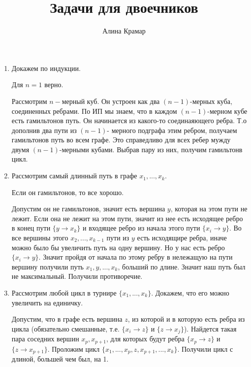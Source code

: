 \documentclass{article}
\begin{document}
\title{Задачи для двоечников}
\author{Алина Крамар}

\maketitle
\begin{enumerate}

\item

Докажем по индукции.

Для $n=1$ верно.

Рассмотрим $n-$мерный куб. Он
устроен как два $(n-1)$-мерных куба, соединенных ребрами. По ИП мы знаем, что в
каждом $(n-1)$-мерном кубе есть гамильтонов путь. Он начинается из
какого-то соединаяющего ребра. Т.о дополнив два пути из $(n-1)$-
мерного подграфа этим ребром, получаем гамильтонов путь во всем
графе. Это справедливо для всех ребер мужду двумя $(n-1)$-мерными
кубами. Выбрав пару из них, получим гамильтонв цикл.

\item

Рассмотрим самый длинный путь в графе $x_{1},...,x_{k}$.

Если он гамильтонов, то все
хорошо.

Допустим он не гамильтонов,
значит есть вершина $y$, которая на этом пути не лежит. Если она не лежит
на этом пути, значит из нее есть исходящее ребро в конец пути $\{y \to
x_{k}\}$ и входящее ребро из начала этого пути $\{x_{i} \to y\}$. Во
все вершины этого $x_{2},...,x_{k-1}$ пути из
$y$ есть исходящире ребра, иначе можно было бы
увеличить путь на одну вершину. Но у нас есть ребро $\{x_{i} \to y\}$. Значит пройдя от начала по этому ребру в нележащую на пути
вершину получили путь $x_{1},y,...,x_{k}$, больший по длине. Значит
наш путь был не максимальный. Получили противоречие.

\item

Рассмотрим любой цикл в турнире $\{x_{1},...,x_{k}\}$.
Докажем, что его можно увеличить на
единичку.

Допустим, что в графе есть вершина $z$, из которой и в которую
есть ребра из цикла (обязательно смешанные, т.е. $\{x_{i} \to z\}$ и
$\{z \to x_{j}\}$).  Найдется такая
пара соседних вершин $x_{p}, x_{p+1}$, для которых будут ребра
$\{x_{p} \to z\}$ и $\{z \to x_{p+1}\}$. Проложим цикл
$\{x_{1},...,x_{p},z,x_{p+1},...,x_{k}\}$. Получили цикл с длиной,
большей чем был, на 1.


\end{enumerate}
\end{document}
